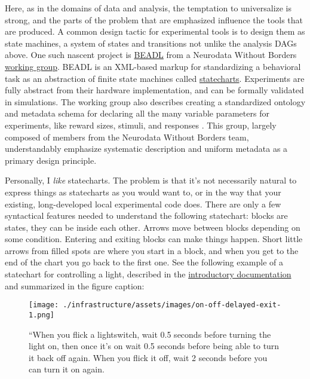 Here, as in the domains of data and analysis, the temptation to
universalize is strong, and the parts of the problem that are emphasized
influence the tools that are produced. A common design tactic for
experimental tools is to design them as state machines, a system of
states and transitions not unlike the analysis DAGs above. One such
nascent project is
\href{https://archive.org/details/beadl-xml-documentation-v-0.1/mode/2up}{BEADL}
\citep{wulfBEADLXMLDocumentation2020}  from a Neurodata Without
Borders
\href{https://archive.org/details/nwb-behavioral-task-wg}{working
group}. BEADL is an XML-based markup for standardizing a behavioral task
as an abstraction of finite state machines called
\href{https://statecharts.github.io/}{statecharts}. Experiments are
fully abstract from their hardware implementation, and can be formally
validated in simulations. The working group also describes creating a
standardized ontology and metadata schema for declaring all the many
variable parameters for experiments, like reward sizes, stimuli, and
responses \citep{nwbbehavioraltaskwgNWBBehavioralTask2020} . This
group, largely composed of members from the Neurodata Without Borders
team, understandably emphasize systematic description and uniform
metadata as a primary design principle.

Personally, I \emph{like} statecharts. The problem is that it's not
necessarily natural to express things as statecharts as you would want
to, or in the way that your existing, long-developed local experimental
code does. There are only a few syntactical features needed to
understand the following statechart: blocks are states, they can be
inside each other. Arrows move between blocks depending on some
condition. Entering and exiting blocks can make things happen. Short
little arrows from filled spots are where you start in a block, and when
you get to the end of the chart you go back to the first one. See the
following example of a statechart for controlling a light, described in
the \href{https://statecharts.dev/on-off-statechart.html}{introductory
documentation} and summarized in the figure caption:

\begin{figure}
\texttt{[image: ./infrastructure/assets/images/on-off-delayed-exit-1.png]}
\label{fig:statechart}
\caption{``When you flick a lightswitch, wait 0.5 seconds before turning
the light on, then once it's on wait 0.5 seconds before being able to
turn it back off again. When you flick it off, wait 2 seconds before you
can turn it on again.}
\end{figure}

